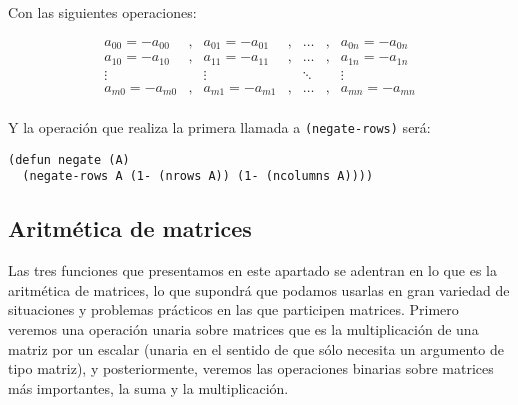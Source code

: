 \documentclass[a4paper,10pt]{article}
\begin{document}
\par \vspace{10pt}	

Con las siguientes operaciones:

\par \vspace{10pt}	

$$
\begin{array}{ccccccccc}
a_{00} = -a_{00} & , & a_{01} = -a_{01} & , & \dots & , & a_{0n} = -a_{0n} \\
a_{10} = -a_{10} & , & a_{11} = -a_{11} & , & \dots & , & a_{1n} = -a_{1n} \\
\vdots & & \vdots & & \ddots & & \vdots\\
a_{m0} = -a_{m0} & , & a_{m1} = -a_{m1} & , & \dots & , & a_{mn} = -a_{mn} \\
\end{array}
$$

\par \vspace{10pt}	

Y la operación que realiza la primera llamada a \texttt{(negate-rows)} será:

\par \vspace{10pt}	

\begin{lstlisting}[language=clips]
(defun negate (A)
  (negate-rows A (1- (nrows A)) (1- (ncolumns A))))
\end{lstlisting}

\vspace{12pt}
\subsection{Aritmética de matrices}
\vspace{10pt}

Las tres funciones que presentamos en este apartado se adentran en lo que es la aritmética de matrices, lo que supondrá que podamos usarlas en gran variedad de situaciones y problemas prácticos en las que participen matrices. Primero veremos una operación unaria sobre matrices que es la multiplicación de una matriz por un escalar (unaria en el sentido de que sólo necesita un argumento de tipo matriz), y posteriormente, veremos las operaciones binarias sobre matrices más importantes, la suma y la multiplicación.

\par \vspace{12pt}	
\end{document}
